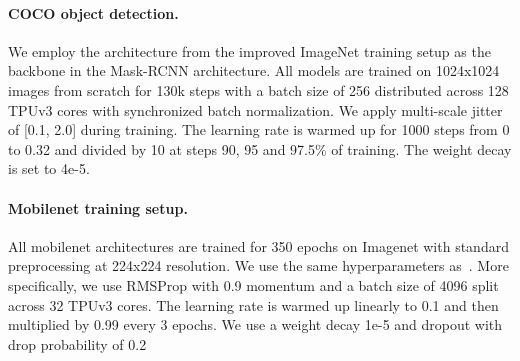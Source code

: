 \documentclass{article} \usepackage{iclr2021_conference,times}
\begin{document}
\paragraph{COCO object detection.}
We employ the architecture from the improved ImageNet training setup as the backbone in the Mask-RCNN architecture.
All models are trained on 1024x1024 images from scratch for 130k steps with a batch size of 256 distributed across 128 TPUv3 cores with synchronized batch normalization.
We apply multi-scale jitter of [0.1, 2.0] during training.
The learning rate is warmed up for 1000 steps from 0 to 0.32 and divided by 10 at steps 90, 95 and 97.5\% of training.
The weight decay is set to 4e-5.

\vspace{-0.1cm}
\paragraph{Mobilenet training setup.}
All mobilenet architectures are trained for 350 epochs on Imagenet with standard preprocessing at 224x224 resolution.
We use the same hyperparameters as~\cite{howard2019searching}.
More specifically, we use RMSProp with 0.9 momentum and a batch size of 4096 split across 32 TPUv3 cores.
The learning rate is warmed up linearly to 0.1 and then multiplied by 0.99 every 3 epochs.
We use a weight decay 1e-5 and dropout with drop probability of 0.2 
\end{document}

